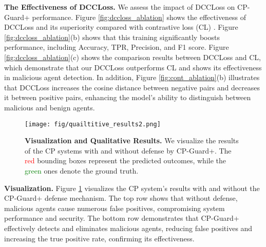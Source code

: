 \textbf{The Effectiveness of DCCLoss.} 
We assess the impact of DCCLoss on CP-Guard+ performance. Figure \ref{fig:dccloss_ablation} shows the effectiveness of DCCLoss and its superiority compared with contrastive loss (CL) \cite{chenSimpleFrameworkContrastive2020}. 
Figure \ref{fig:dccloss_ablation}(b) shows that this training significantly boosts performance, including Accuracy, TPR, Precision, and F1 score. Figure \ref{fig:dccloss_ablation}(c) shows the comparison results between DCCLoss and CL, which demonstrate that our DCCLoss outperforms CL and shows its effectiveness in malicious agent detection. In addition, 
Figure \ref{fig:cont_ablation}(b) illustrates that DCCLoss increases the cosine distance between negative pairs and decreases it between positive pairs, enhancing the model's ability to distinguish between malicious and benign agents.






\begin{figure}[t]
    \centering
    \texttt{[image: fig/quailtitive\_results2.png]}
    \vspace{-10mm}
    \caption{\textbf{Visualization and Qualitative Results.} We visualize the results of the CP systems with and without defense by CP-Guard+. The \textcolor{red}{red} bounding boxes represent the predicted outcomes, while the \textcolor{green}{green} ones denote the ground truth.}
    \label{fig:qualitative_results}
    \vspace{-4mm} 
\end{figure}



\textbf{Visualization.} Figure \ref{fig:qualitative_results} visualizes the CP system's results with and without the CP-Guard+ defense mechanism. The top row shows that without defense, malicious agents cause numerous false positives, compromising system performance and security. The bottom row demonstrates that CP-Guard+ effectively detects and eliminates malicious agents, reducing false positives and increasing the true positive rate, confirming its effectiveness.

\vspace{-3mm}